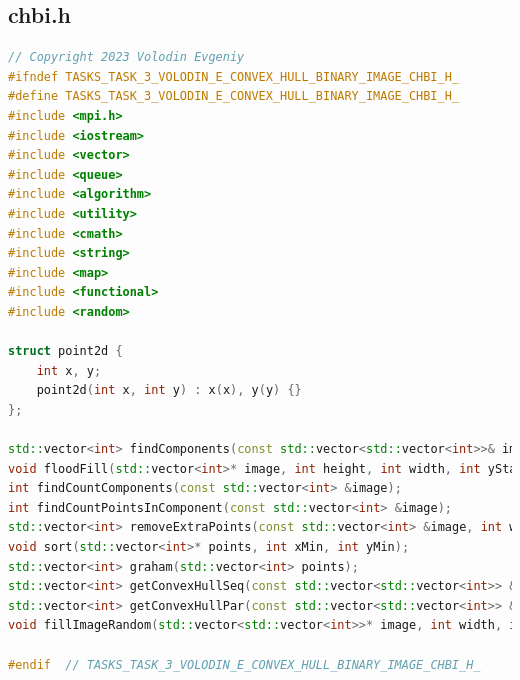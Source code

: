\documentclass[a4paper, 12pt]{extarticle}
\begin{document}
	\subsection*{chbi.h}
	\begin{lstlisting}[language=C++]
// Copyright 2023 Volodin Evgeniy
#ifndef TASKS_TASK_3_VOLODIN_E_CONVEX_HULL_BINARY_IMAGE_CHBI_H_
#define TASKS_TASK_3_VOLODIN_E_CONVEX_HULL_BINARY_IMAGE_CHBI_H_
#include <mpi.h>
#include <iostream>
#include <vector>
#include <queue>
#include <algorithm>
#include <utility>
#include <cmath>
#include <string>
#include <map>
#include <functional>
#include <random>

struct point2d {
	int x, y;
	point2d(int x, int y) : x(x), y(y) {}
};

std::vector<int> findComponents(const std::vector<std::vector<int>>& image, int width, int height);
void floodFill(std::vector<int>* image, int height, int width, int yStart, int xStart, int label);
int findCountComponents(const std::vector<int> &image);
int findCountPointsInComponent(const std::vector<int> &image);
std::vector<int> removeExtraPoints(const std::vector<int> &image, int width, int height, int component);
void sort(std::vector<int>* points, int xMin, int yMin);
std::vector<int> graham(std::vector<int> points);
std::vector<int> getConvexHullSeq(const std::vector<std::vector<int>> &image, int width, int height);
std::vector<int> getConvexHullPar(const std::vector<std::vector<int>> &image, int width, int height);
void fillImageRandom(std::vector<std::vector<int>>* image, int width, int height);

#endif  // TASKS_TASK_3_VOLODIN_E_CONVEX_HULL_BINARY_IMAGE_CHBI_H_
	\end{lstlisting}
\end{document}
